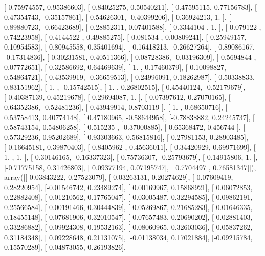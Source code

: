 \documentclass{article}
\begin{document}
       [-0.75974557,  0.95386603],
       [-0.84025275,  0.50540211],
       [ 0.47595115,  0.77156783],
       [ 0.47354743, -0.35157861],
       [-0.54626301, -0.40399206],
       [ 0.36924213,  1.        ],
       [ 0.89880723, -0.66423689],
       [ 0.28852311,  0.07401588],
       [-0.3344104 ,  1.        ],
       [ 0.079122  ,  0.74223958],
       [ 0.4144522 ,  0.49885275],
       [ 0.081534  ,  0.00809241],
       [ 0.25949157,  0.10954583],
       [ 0.80945558,  0.35401694],
       [-0.16418213, -0.26627264],
       [-0.89086167, -0.17314836],
       [ 0.30231581,  0.40511366],
       [-0.08728386, -0.03196309],
       [-0.5694844 ,  0.07772651],
       [ 0.32586692,  0.64469639],
       [-1.        ,  0.17460379],
       [ 0.10098827,  0.54864721],
       [ 0.43539919, -0.36659513],
       [-0.24996091,  0.18262987],
       [-0.50338833,  0.83151962],
       [-1.        , -0.15742515],
       [-1.        ,  0.26802515],
       [ 0.45440124, -0.52179679],
       [-0.40387139,  0.45219678],
       [-0.29694087,  1.        ],
       [ 0.07397612,  0.27070165],
       [ 0.64352386, -0.52481236],
       [-0.43949914,  0.8703119 ],
       [-1.        ,  0.68650716],
       [ 0.53758413,  0.40774148],
       [ 0.47180965, -0.58644958],
       [-0.78838882,  0.24245737],
       [ 0.58743154,  0.54806258],
       [ 0.515235  , -0.37000885],
       [ 0.65368472,  0.456744  ],
       [ 0.57329236,  0.95202689],
       [ 0.93303663,  0.56815816],
       [-0.27981153,  0.28903485],
       [-0.16645181,  0.39870403],
       [ 0.8405962 ,  0.45636011],
       [-0.34420929,  0.69971699],
       [ 1.        ,  1.        ],
       [-0.30146165, -0.16337323],
       [-0.75736307, -0.25793679],
       [-0.14915806,  1.        ],
       [-0.71775158,  0.31426803],
       [ 0.09377194,  0.07195747],
       [ 0.7704497 ,  0.76581347]]), array([[ 0.03843222,  0.27523079],
       [-0.03263131,  0.20274629],
       [ 0.07609419,  0.28220954],
       [-0.01546742,  0.23489274],
       [ 0.00169967,  0.15868921],
       [ 0.06072853,  0.22882408],
       [-0.01210562,  0.17765047],
       [ 0.03005487,  0.32294585],
       [-0.09862191,  0.25566584],
       [ 0.00191466,  0.30444839],
       [-0.05269867,  0.21685283],
       [ 0.01646335,  0.18455148],
       [ 0.07681906,  0.32010547],
       [ 0.07657483,  0.20690202],
       [-0.02881403,  0.33286882],
       [ 0.09924308,  0.19532163],
       [ 0.08060965,  0.32603036],
       [ 0.05837262,  0.31184348],
       [ 0.09228648,  0.21131075],
       [-0.01138034,  0.17021884],
       [-0.09215784,  0.15570289],
       [ 0.04873055,  0.26193826],
\end{document}
